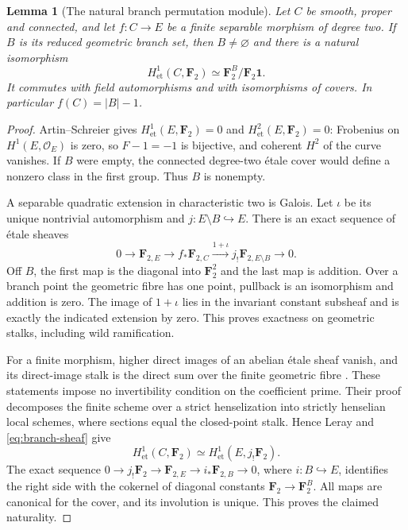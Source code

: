 \documentclass[11pt]{article}
\newtheorem{lemma}[theorem]{Lemma}
\theoremstyle{remark}\newtheorem{remark}[theorem]{Remark}
\newcommand{\OO}{\mathcal O}
\newcommand{\FF}{\mathbf F}
\newcommand{\et}{\mathrm{et}}
\begin{document}
\begin{lemma}[The natural branch permutation module]\label{lem:branch}
Let $C$ be smooth, proper and connected, and let $f:C\to E$ be a finite separable morphism of degree two. If $B$ is its reduced geometric branch set, then $B\ne\varnothing$ and there is a natural isomorphism
\begin{equation}\label{eq:branch-module}
                    H^1_{\et}(C,\FF_2)\simeq\FF_2^B/\FF_2\mathbf1.
\end{equation}
It commutes with field automorphisms and with isomorphisms of covers. In particular $f(C)=|B|-1$.
\end{lemma}
\begin{proof}
Artin--Schreier gives $H^1_{\et}(E,\FF_2)=0$ and $H^2_{\et}(E,\FF_2)=0$: Frobenius on $H^1(E,\OO_E)$ is zero, so $F-1=-1$ is bijective, and coherent $H^2$ of the curve vanishes. If $B$ were empty, the connected degree-two \'etale cover would define a nonzero class in the first group. Thus $B$ is nonempty.

A separable quadratic extension in characteristic two is Galois. Let $\iota$ be its unique nontrivial automorphism and $j:E\setminus B\hookrightarrow E$. There is an exact sequence of \'etale sheaves
\begin{equation}\label{eq:branch-sheaf}
 0\longrightarrow\FF_{2,E}\longrightarrow f_*\FF_{2,C}
          \xrightarrow{1+\iota}j_!\FF_{2,E\setminus B}\longrightarrow0.
\end{equation}
Off $B$, the first map is the diagonal into $\FF_2^2$ and the last map is addition. Over a branch point the geometric fibre has one point, pullback is an isomorphism and addition is zero. The image of $1+\iota$ lies in the invariant constant subsheaf and is exactly the indicated extension by zero. This proves exactness on geometric stalks, including wild ramification.

For a finite morphism, higher direct images of an abelian \'etale sheaf vanish, and its direct-image stalk is the direct sum over the finite geometric fibre \citep[Lemma~59.55.1 and Proposition~59.55.2, full proofs]{StacksFinite}. These statements impose no invertibility condition on the coefficient prime. Their proof decomposes the finite scheme over a strict henselization into strictly henselian local schemes, where sections equal the closed-point stalk. Hence Leray and \eqref{eq:branch-sheaf} give
\[
 H^1_{\et}(C,\FF_2)\simeq H^1_{\et}(E,j_!\FF_2).
\]
The exact sequence $0\to j_!\FF_2\to\FF_{2,E}\to i_*\FF_{2,B}\to0$, where $i:B\hookrightarrow E$, identifies the right side with the cokernel of diagonal constants $\FF_2\to\FF_2^B$. All maps are canonical for the cover, and its involution is unique. This proves the claimed naturality.
\end{proof}
\end{document}
